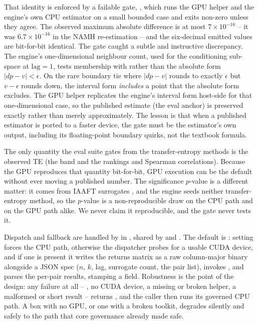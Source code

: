 That identity is enforced by a failable gate, , which runs the
GPU helper and the engine's own CPU estimator on a small bounded case and exits
non-zero unless they agree. The observed maximum absolute difference is at most
$7\times 10^{-16}$ -- it was $6.7\times 10^{-16}$ in the NAMH re-estimation -- and the
six-decimal emitted values are bit-for-bit identical. The gate caught a subtle and
instructive discrepancy. The engine's one-dimensional neighbour count, used for the
conditioning sub-space at $\text{lag}=1$, tests membership with
 rather than the absolute form $|dp - v| < \epsilon$. On
the rare boundary tie where $|dp - v|$ rounds to exactly $\epsilon$ but $v - \epsilon$
rounds down, the interval form \emph{includes} a point that the absolute form excludes.
The GPU helper replicates the engine's interval form host-side for that
one-dimensional case, so the published estimate (the eval anchor) is preserved exactly
rather than merely approximately. The lesson is that when a published estimator is
ported to a faster device, the gate must be the estimator's own output, including its
floating-point boundary quirks, not the textbook formula.

\begin{principle}
\label{prin:gate-output}
The only quantity the eval suite gates from the transfer-entropy methods is the
observed TE (the  band and the  rankings and
Spearman correlations). Because the GPU reproduces that quantity bit-for-bit, GPU
execution can be the default without ever moving a published number. The significance
$p$-value is a different matter: it comes from IAAFT surrogates
\citep{schreiber1996}, and the engine seeds neither transfer-entropy method, so the
$p$-value is a non-reproducible draw on the CPU path and on the GPU path alike. We
never claim it reproducible, and the gate never tests it.
\end{principle}

Dispatch and fallback are handled by  in
, shared by  and . The
default is : setting  forces the CPU path, otherwise the
dispatcher probes for a usable CUDA device, and if one is present it writes the
returns matrix as a raw column-major binary alongside a JSON spec
($n$, $k$, lag, surrogate count, the pair list), invokes , and
parses the per-pair results, stamping a  field. Robustness is the
point of the design: any failure at all -- , no CUDA device, a missing
or broken helper, a malformed or short result -- returns , and the caller
then runs its governed CPU  path. A box with no GPU, or one with a
broken toolkit, degrades silently and safely to the path that core governance already
made safe.

